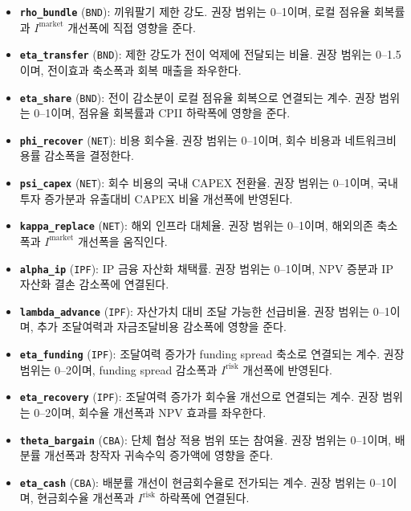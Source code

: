 \documentclass[11pt,a4paper]{report}
\newenvironment{summarylist}{\begin{itemize}[leftmargin=1.8em,itemsep=0.35em,topsep=0.35em]\RaggedRight}{\end{itemize}}
\begin{document}
\begingroup
\small
\begin{summarylist}
  \item \textbf{\texttt{rho\_bundle}} (\texttt{BND}): 끼워팔기 제한 강도. 권장 범위는 0--1이며, 로컬 점유율 회복률과 $I^{\mathrm{market}}$ 개선폭에 직접 영향을 준다.
  \item \textbf{\texttt{eta\_transfer}} (\texttt{BND}): 제한 강도가 전이 억제에 전달되는 비율. 권장 범위는 0--1.5이며, 전이효과 축소폭과 회복 매출을 좌우한다.
  \item \textbf{\texttt{eta\_share}} (\texttt{BND}): 전이 감소분이 로컬 점유율 회복으로 연결되는 계수. 권장 범위는 0--1이며, 점유율 회복률과 CPII 하락폭에 영향을 준다.
  \item \textbf{\texttt{phi\_recover}} (\texttt{NET}): 비용 회수율. 권장 범위는 0--1이며, 회수 비용과 네트워크비용률 감소폭을 결정한다.
  \item \textbf{\texttt{psi\_capex}} (\texttt{NET}): 회수 비용의 국내 CAPEX 전환율. 권장 범위는 0--1이며, 국내 투자 증가분과 유출대비 CAPEX 비율 개선폭에 반영된다.
  \item \textbf{\texttt{kappa\_replace}} (\texttt{NET}): 해외 인프라 대체율. 권장 범위는 0--1이며, 해외의존 축소폭과 $I^{\mathrm{market}}$ 개선폭을 움직인다.
  \item \textbf{\texttt{alpha\_ip}} (\texttt{IPF}): IP 금융 자산화 채택률. 권장 범위는 0--1이며, NPV 증분과 IP 자산화 결손 감소폭에 연결된다.
  \item \textbf{\texttt{lambda\_advance}} (\texttt{IPF}): 자산가치 대비 조달 가능한 선급비율. 권장 범위는 0--1이며, 추가 조달여력과 자금조달비용 감소폭에 영향을 준다.
  \item \textbf{\texttt{eta\_funding}} (\texttt{IPF}): 조달여력 증가가 funding spread 축소로 연결되는 계수. 권장 범위는 0--2이며, funding spread 감소폭과 $I^{\mathrm{risk}}$ 개선폭에 반영된다.
  \item \textbf{\texttt{eta\_recovery}} (\texttt{IPF}): 조달여력 증가가 회수율 개선으로 연결되는 계수. 권장 범위는 0--2이며, 회수율 개선폭과 NPV 효과를 좌우한다.
  \item \textbf{\texttt{theta\_bargain}} (\texttt{CBA}): 단체 협상 적용 범위 또는 참여율. 권장 범위는 0--1이며, 배분률 개선폭과 창작자 귀속수익 증가액에 영향을 준다.
  \item \textbf{\texttt{eta\_cash}} (\texttt{CBA}): 배분률 개선이 현금회수율로 전가되는 계수. 권장 범위는 0--1이며, 현금회수율 개선폭과 $I^{\mathrm{risk}}$ 하락폭에 연결된다.
\end{summarylist}
\endgroup
\end{document}
